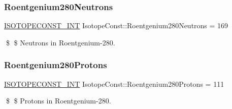 \subsubsection{\texorpdfstring{Roentgenium280\+Neutrons}{Roentgenium280Neutrons}}
{\footnotesize\ttfamily \mbox{\hyperlink{group___isotope_const-_macros_ga5f18360b3e99483a35c32d789e62621c}{I\+S\+O\+T\+O\+P\+E\+C\+O\+N\+S\+T\+\_\+\+I\+NT}} Isotope\+Const\+::\+Roentgenium280\+Neutrons = 169}

\$ \$ Neutrons in Roentgenium-\/280. \mbox{\label{group___isotope_const-_roentgenium-_rg280_gaeb8095c06f49bf5a256dc9f6c2245e0e}} 
\subsubsection{\texorpdfstring{Roentgenium280\+Protons}{Roentgenium280Protons}}
{\footnotesize\ttfamily \mbox{\hyperlink{group___isotope_const-_macros_ga5f18360b3e99483a35c32d789e62621c}{I\+S\+O\+T\+O\+P\+E\+C\+O\+N\+S\+T\+\_\+\+I\+NT}} Isotope\+Const\+::\+Roentgenium280\+Protons = 111}

\$ \$ Protons in Roentgenium-\/280. 